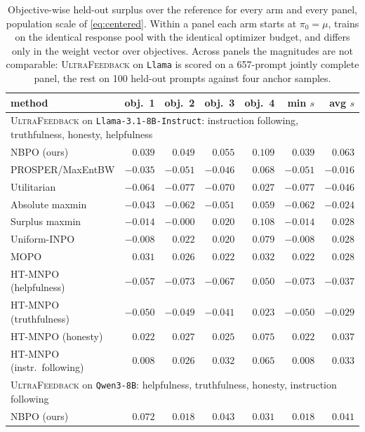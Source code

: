 \documentclass{article}
\theoremstyle{remark}
\theoremstyle{plain}
\newcommand{\NBPO}{\textsc{NBPO}}
\begin{document}
\begin{table}[t]
\centering\scriptsize
\setlength{\tabcolsep}{3.2pt}
\caption{Objective-wise held-out surplus over the reference for every arm and every panel, population
scale of \eqref{eq:centered}. Within a panel each arm starts at $\pi_0=\mu$, trains on the identical
response pool with the identical optimizer budget, and differs only in the weight vector over objectives.
Across panels the magnitudes are not comparable: \textsc{UltraFeedback} on \texttt{Llama} is scored on a
657-prompt jointly complete panel, the rest on 100 held-out prompts against four anchor samples.}
\label{tab:objectivewise-appendix}
\begin{tabular}{lrrrrrr}
\toprule
method & obj.\ 1 & obj.\ 2 & obj.\ 3 & obj.\ 4 & min $s$ & avg $s$\\
\midrule
\multicolumn{7}{l}{\textsc{UltraFeedback} on \texttt{Llama-3.1-8B-Instruct}: instruction following, truthfulness, honesty, helpfulness}\\
\NBPO{} (ours) & $0.039$ & $0.049$ & $0.055$ & $0.109$ & $0.039$ & $0.063$\\
PROSPER/MaxEntBW & $-0.035$ & $-0.051$ & $-0.046$ & $0.068$ & $-0.051$ & $-0.016$\\
Utilitarian & $-0.064$ & $-0.077$ & $-0.070$ & $0.027$ & $-0.077$ & $-0.046$\\
Absolute maxmin & $-0.043$ & $-0.062$ & $-0.051$ & $0.059$ & $-0.062$ & $-0.024$\\
Surplus maxmin & $-0.014$ & $-0.000$ & $0.020$ & $0.108$ & $-0.014$ & $0.028$\\
Uniform-INPO & $-0.008$ & $0.022$ & $0.020$ & $0.079$ & $-0.008$ & $0.028$\\
MOPO & $0.031$ & $0.026$ & $0.022$ & $0.032$ & $0.022$ & $0.028$\\
HT-MNPO (helpfulness) & $-0.057$ & $-0.073$ & $-0.067$ & $0.050$ & $-0.073$ & $-0.037$\\
HT-MNPO (truthfulness) & $-0.050$ & $-0.049$ & $-0.041$ & $0.023$ & $-0.050$ & $-0.029$\\
HT-MNPO (honesty) & $0.022$ & $0.027$ & $0.025$ & $0.075$ & $0.022$ & $0.037$\\
HT-MNPO (instr.\ following) & $0.008$ & $0.026$ & $0.032$ & $0.065$ & $0.008$ & $0.033$\\
\midrule
\multicolumn{7}{l}{\textsc{UltraFeedback} on \texttt{Qwen3-8B}: helpfulness, truthfulness, honesty, instruction following}\\
\NBPO{} (ours) & $0.072$ & $0.018$ & $0.043$ & $0.031$ & $0.018$ & $0.041$\\

\end{tabular}
\end{table}
\end{document}
